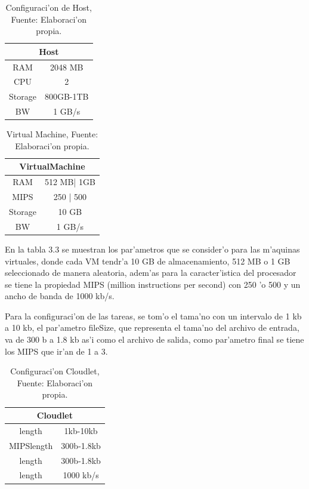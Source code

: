 \begin{table}[!hbt]
	\centering
	\caption{Configuraci'on de Host, Fuente: Elaboraci'on propia.}
	\label{my-label}
	\begin{tabular}{@{}cc@{}}
		\toprule
		\multicolumn{2}{c}{{\bf Host}} \\ \midrule
		RAM           & 2048 MB        \\
		CPU           & 2              \\
		Storage       & 800GB-1TB      \\ \midrule
		BW            & 1 GB/s        
	\end{tabular}
\end{table}

\begin{table}[!hbt]
	\centering
	\caption{Virtual Machine, Fuente: Elaboraci'on propia.}
	\label{my-label}
	\begin{tabular}{@{}cc@{}}
		\toprule
		\multicolumn{2}{c}{{\bf VirtualMachine}} \\ \midrule
		RAM               & 512 MB| 1GB          \\
		MIPS              & 250 | 500            \\
		Storage           & 10 GB                \\ \midrule
		BW                & 1 GB/s              
	\end{tabular}
\end{table}


En la tabla 3.3 se muestran los par'ametros que se consider'o para las m'aquinas virtuales, donde cada VM tendr'a 10 GB de almacenamiento, 512 MB  o 1 GB seleccionado de manera aleatoria, adem'as para la caracter'istica del procesador se tiene  la propiedad MIPS (million instructions per second) con 250 'o 500 y un ancho de banda de 1000 kb/s.

Para la configuraci'on de las tareas, se tom'o el tama'no con un intervalo de 1 kb a 10 kb,  el par'ametro fileSize, que representa el tama'no del archivo de entrada, va de 300 b a 1.8 kb as'i como el archivo de salida, como par'ametro final se tiene los MIPS que ir'an de 1 a 3.



\begin{table}[!hbt]
	\centering
	\caption{Configuraci'on Cloudlet, Fuente: Elaboraci'on propia.}
	\label{my-label}
	\begin{tabular}{@{}cc@{}}
		\toprule
		\multicolumn{2}{c}{{\bf Cloudlet}} \\ \midrule
		length           & 1kb-10kb        \\
		MIPSlength       & 300b-1.8kb      \\
		length           & 300b-1.8kb      \\ \midrule
		length           & 1000 kb/s      
	\end{tabular}
\end{table}

